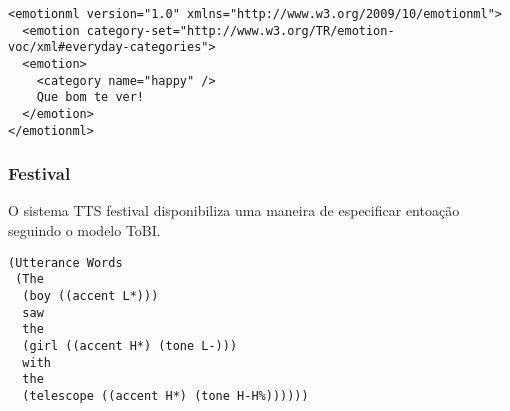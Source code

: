 \begin{lstlisting}[caption=Exemplo de texto anotado com EmotionML com parâmetros
  discretos]
<emotionml version="1.0" xmlns="http://www.w3.org/2009/10/emotionml">
  <emotion category-set="http://www.w3.org/TR/emotion-voc/xml#everyday-categories">
  <emotion>
    <category name="happy" />
    Que bom te ver!
  </emotion>
</emotionml>
\end{lstlisting}


\subsubsection{Festival}
O sistema TTS festival disponibiliza uma maneira de especificar entoação
seguindo o modelo ToBI.

\begin{lstlisting}[caption=Anotações no modelo ToBI para o sistema TTS Festival]
(Utterance Words 
 (The
  (boy ((accent L*)))
  saw
  the
  (girl ((accent H*) (tone L-)))
  with 
  the
  (telescope ((accent H*) (tone H-H%))))))
\end{lstlisting}